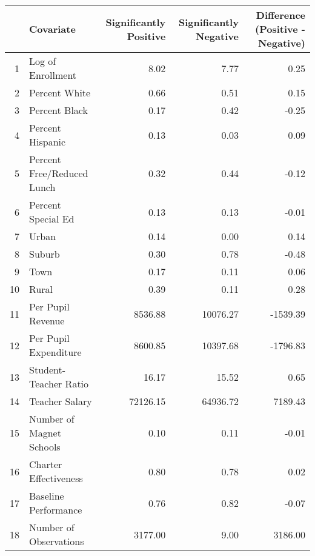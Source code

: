 \begin{tabular}{rlrrr}
  \hline
 & Covariate & Significantly Positive & Significantly Negative & Difference (Positive - Negative) \\ 
  \hline
1 & Log of Enrollment & 8.02 & 7.77 & 0.25 \\ 
  2 & Percent White & 0.66 & 0.51 & 0.15 \\ 
  3 & Percent Black & 0.17 & 0.42 & -0.25 \\ 
  4 & Percent Hispanic & 0.13 & 0.03 & 0.09 \\ 
  5 & Percent Free/Reduced Lunch & 0.32 & 0.44 & -0.12 \\ 
  6 & Percent Special Ed & 0.13 & 0.13 & -0.01 \\ 
  7 & Urban & 0.14 & 0.00 & 0.14 \\ 
  8 & Suburb & 0.30 & 0.78 & -0.48 \\ 
  9 & Town & 0.17 & 0.11 & 0.06 \\ 
  10 & Rural & 0.39 & 0.11 & 0.28 \\ 
  11 & Per Pupil Revenue & 8536.88 & 10076.27 & -1539.39 \\ 
  12 & Per Pupil Expenditure & 8600.85 & 10397.68 & -1796.83 \\ 
  13 & Student-Teacher Ratio & 16.17 & 15.52 & 0.65 \\ 
  14 & Teacher Salary & 72126.15 & 64936.72 & 7189.43 \\ 
  15 & Number of Magnet Schools & 0.10 & 0.11 & -0.01 \\ 
  16 & Charter Effectiveness & 0.80 & 0.78 & 0.02 \\ 
  17 & Baseline Performance & 0.76 & 0.82 & -0.07 \\ 
  18 & Number of Observations & 3177.00 & 9.00 & 3186.00 \\ 
   \hline
\end{tabular}
